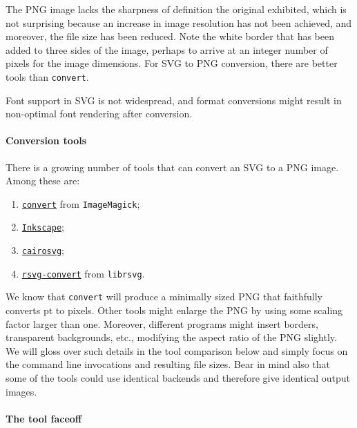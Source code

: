 \documentclass[
  11pt,
  british,
  a4paper,
]{article}
\begin{document}
The PNG image lacks the sharpness of definition the original exhibited,
which is not surprising because an increase in image resolution has not
been achieved, and moreover, the file size has been reduced. Note the
white border that has been added to three sides of the image, perhaps to
arrive at an integer number of pixels for the image dimensions. For SVG
to PNG conversion, there are better tools than \texttt{convert}.

Font support in SVG is not widespread, and format conversions might
result in non-optimal font rendering after conversion.

\hypertarget{conversion-tools}{%
\paragraph{Conversion tools}\label{conversion-tools}}

There is a growing number of tools that can convert an SVG to a PNG
image. Among these are:

\begin{enumerate}
\def\labelenumi{\alph{enumi}.}
\item
  \href{https://imagemagick.org/script/convert.php}{\texttt{convert}}
  from \texttt{ImageMagick};
\item
  \href{https://inkscape.org/}{\texttt{Inkscape}};
\item
  \href{https://cairosvg.org/}{\texttt{cairosvg}};
\item
  \href{https://en.wikipedia.org/wiki/Librsvg}{\texttt{rsvg-convert}}
  from \texttt{librsvg}.
\end{enumerate}

We know that \texttt{convert} will produce a minimally sized PNG that
faithfully converts pt to pixels. Other tools might enlarge the PNG by
using some scaling factor larger than one. Moreover, different programs
might insert borders, transparent backgrounds, etc., modifying the
aspect ratio of the PNG slightly. We will gloss over such details in the
tool comparison below and simply focus on the command line invocations
and resulting file sizes. Bear in mind also that some of the tools could
use identical backends and therefore give identical output images.

\hypertarget{the-tool-faceoff}{%
\paragraph{The tool faceoff}\label{the-tool-faceoff}}
\end{document}
